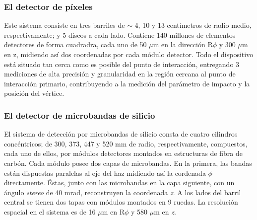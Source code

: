 
\subsubsection{El detector de p\'ixeles}

   Este sistema consiste en tres barriles de $\sim$ 4, 10 y 13 cent\'imetros de radio medio, respectivamente; y 5 discos a cada lado. Contiene 140 millones de elementos detectores de forma cuadradra,  cada uno de 50 $\mu$m en la direcci\'on R$\phi$ y 300 $\mu$m en z, midiendo as\'i dos coordenadas por cada m\'odulo detector. Todo el dispositivo est\'a situado tan cerca como es posible del punto de interacci\'on, entregando 3 mediciones de alta precisi\'on y granularidad en la regi\'on cercana al punto de interacci\'on primario, contribuyendo a la medici\'on del par\'ametro de impacto y la posici\'on del v\'ertice.

\subsubsection{El detector de microbandas de silicio}

   El sistema de detecci\'on por microbandas de silicio consta de cuatro cilindros conc\'entricos; de 300, 373, 447 y 520 mm de radio, respectivamente, compuestos, cada uno de ellos, por  m\'odulos detectores montados en estructuras de fibra de carb\'on. Cada m\'odulo posee dos capas de microbandas. En la primera, las bandas est\'an dispuestas paralelas al eje del haz midiendo as\'i la cordenada $\phi$ directamente. \'Estas, junto con las microbandas en la capa siguiente, con un \'angulo \emph{stereo} de 40 mrad, reconstruyen la coordenada \emph{z}. A los lados del barril central se tienen dos tapas con m\'odulos montados en 9 ruedas. La resoluci\'on espacial en el sistema es de 16 $\mu$m en R$\phi$ y 580 $\mu$m en \emph{z}.

